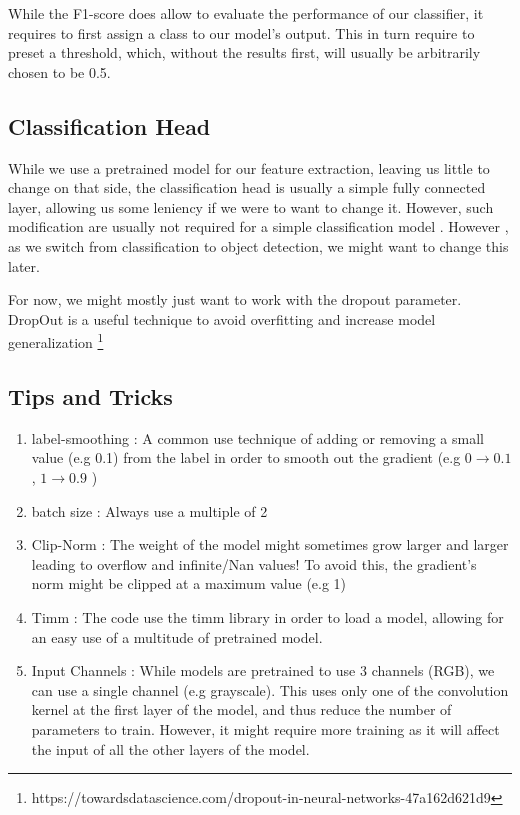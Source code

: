 \documentclass[11pt]{article}
\begin{document}
        While the F1-score does allow to evaluate the performance of our classifier, it requires to first assign a class
        to our model's output. This in turn require to preset a threshold, which, without the results first, will usually be arbitrarily
        chosen to be 0.5.


    \subsection{Classification Head}

        While we use a pretrained model for our feature extraction, leaving us little to change on that side, the classification head is usually a simple fully connected
        layer, allowing us some leniency if we were to want to change it. However, such modification are usually not required for a simple classification model . However , as we switch
        from  classification to object detection, we might want to change this later.

        For now, we might mostly just want to work with the dropout parameter. DropOut is a useful technique to avoid overfitting and increase model
        generalization \footnote{https://towardsdatascience.com/dropout-in-neural-networks-47a162d621d9}

    \subsection{Tips and Tricks}

    \begin{enumerate}
        \item label-smoothing : A common use technique of adding or removing a small value (e.g 0.1) from the label in
        order to smooth out the gradient (e.g $0\xrightarrow{}0.1$ , $1\xrightarrow{}0.9$ )

        \item batch size : Always use a multiple of 2

        \item Clip-Norm : The weight of the model might sometimes grow larger and larger leading to overflow and
        infinite/Nan values! To avoid this, the gradient's norm might be clipped at a maximum value (e.g 1)
        
        \item Timm : The code use the timm library \cite{timm} in order to load a model, allowing
        for an easy use of a multitude of pretrained model.


        \item Input Channels : While models are pretrained to use 3 channels (RGB), we can use a single channel (e.g grayscale). This uses
        only one of the convolution kernel at the first layer of the model, and thus reduce the number of parameters to train. However, it might require more training
        as it will affect the input of all the other layers of the model.

    \end{enumerate}
\end{document}
